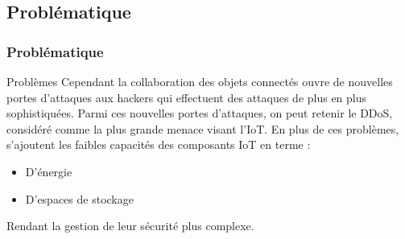 \documentclass[aspectratio=169,professionalfonts, 12pt]{beamer}
\begin{document}
\subsection{Problématique}
\begin{frame}
    \frametitle{Problématique}
    \justifying
    \begin{alertblock}{Problèmes}
Cependant la collaboration des objets connectés ouvre de nouvelles portes d’attaques aux hackers qui effectuent des attaques de plus en plus sophistiquées.
Parmi ces nouvelles portes d’attaques, on peut retenir le DDoS, considéré comme la plus grande menace visant l’IoT.
En plus de ces problèmes, s'ajoutent les faibles capacités des composants IoT en terme : 
\begin{itemize}
\item D'\'energie
\item D'espaces de stockage 
\end{itemize}
Rendant la gestion de leur sécurité plus complexe.  
\end{alertblock}    

  
\end{frame}
\end{document}
